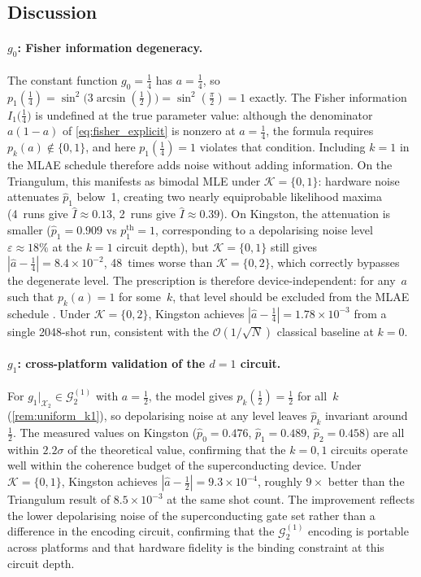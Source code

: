 \documentclass[12pt,a4paper]{article}
\theoremstyle{plain}
\theoremstyle{definition}
\theoremstyle{remark}
\newcommand{\Gclass}[2]{\mathcal{G}_{#1}^{(#2)}}
\begin{document}
\subsection{Discussion}
\label{subsec:hw_discussion}

\paragraph{$g_0$: Fisher information degeneracy.}
The constant function $g_0=\tfrac{1}{4}$ has $a=\tfrac{1}{4}$,
so $p_1(\tfrac{1}{4})=\sin^2\bigl(3\arcsin(\tfrac{1}{2})\bigr)
=\sin^2(\tfrac{\pi}{2})=1$ exactly.
The Fisher information $I_1\!\bigl(\tfrac{1}{4}\bigr)$ is undefined
at the true parameter value: although the denominator $a(1-a)$ of
\eqref{eq:fisher_explicit} is nonzero at $a=\tfrac{1}{4}$, the formula
requires $p_k(a)\notin\{0,1\}$, and here $p_1(\tfrac{1}{4})=1$ violates
that condition.
Including $k=1$ in the MLAE schedule therefore adds noise without
adding information.
On the Triangulum, this manifests as bimodal MLE under
$\mathcal{K}=\{0,1\}$: hardware noise attenuates $\hat{p}_1$
below~1, creating two nearly equiprobable likelihood maxima
(4~runs give $\hat{I}\approx0.13$, 2~runs give $\hat{I}\approx0.39$).
On Kingston, the attenuation is smaller ($\hat{p}_1=0.909$ vs
$p_1^{\mathrm{th}}=1$, corresponding to a depolarising noise level
$\varepsilon\approx18\%$ at the $k=1$ circuit depth), but
$\mathcal{K}=\{0,1\}$ still gives $|\hat{a}-\tfrac{1}{4}|=8.4\times10^{-2}$,
48~times worse than $\mathcal{K}=\{0,2\}$, which correctly bypasses
the degenerate level.
The prescription is therefore device-independent: for any~$a$ such
that $p_k(a)=1$ for some~$k$, that level should be excluded from
the MLAE schedule \cite{SuzukiEtAl2019}.
Under $\mathcal{K}=\{0,2\}$, Kingston achieves
$|\hat{a}-\tfrac{1}{4}|=1.78\times10^{-3}$ from a single
2048-shot run, consistent with the $\mathcal{O}(1/\sqrt{N})$
classical baseline at $k=0$.

\paragraph{$g_1$: cross-platform validation of the $d=1$ circuit.}
For $g_1|_{\mathcal{X}_2}\in\Gclass{2}{1}$ with $a=\tfrac{1}{2}$, the model gives
$p_k(\tfrac{1}{2})=\tfrac{1}{2}$ for all~$k$ (\cref{rem:uniform_k1}),
so depolarising noise at any level leaves $\hat{p}_k$ invariant
around~$\tfrac{1}{2}$.
The measured values on Kingston ($\hat{p}_0=0.476$,
$\hat{p}_1=0.489$, $\hat{p}_2=0.458$) are all within $2.2\sigma$
of the theoretical value, confirming that the $k=0,1$ circuits
operate well within the coherence budget of the superconducting
device.
Under $\mathcal{K}=\{0,1\}$, Kingston achieves
$|\hat{a}-\tfrac{1}{2}|=9.3\times10^{-4}$, roughly $9\times$
better than the Triangulum result of $8.5\times10^{-3}$ at the
same shot count.
The improvement reflects the lower depolarising noise of the
superconducting gate set rather than a difference in the
encoding circuit, confirming that the $\Gclass{2}{1}$ encoding
is portable across platforms and that hardware fidelity is the
binding constraint at this circuit depth.
\end{document}
